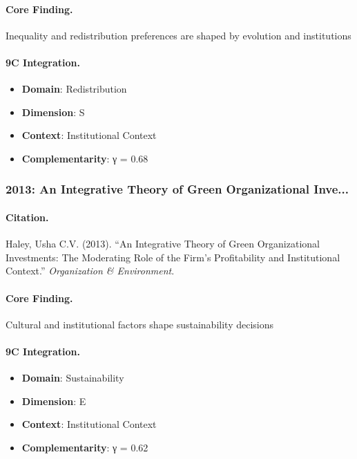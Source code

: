\paragraph{Core Finding.}
Inequality and redistribution preferences are shaped by evolution and institutions

\paragraph{9C Integration.}
\begin{itemize}[nosep]
  \item \textbf{Domain}: Redistribution
  \item \textbf{Dimension}: S
  \item \textbf{Context}: Institutional Context
  \item \textbf{Complementarity}: γ = 0.68
\end{itemize}

\subsubsection{2013: An Integrative Theory of Green Organizational Inve...}

\paragraph{Citation.}
Haley, Usha C.V. (2013). ``An Integrative Theory of Green Organizational Investments: The Moderating Role of the Firm's Profitability and Institutional Context.''
\textit{Organization & Environment}.

\paragraph{Core Finding.}
Cultural and institutional factors shape sustainability decisions

\paragraph{9C Integration.}
\begin{itemize}[nosep]
  \item \textbf{Domain}: Sustainability
  \item \textbf{Dimension}: E
  \item \textbf{Context}: Institutional Context
  \item \textbf{Complementarity}: γ = 0.62
\end{itemize}

